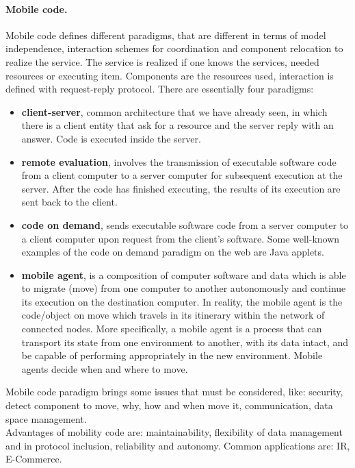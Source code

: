 \paragraph*{Mobile code.} Mobile code defines different paradigms, that are different in terms of model independence, interaction schemes for coordination and component relocation to realize the service. The service is realized if one knows the services, needed resources or executing item. Components are the resources used, interaction is defined with request-reply protocol. There are essentially four paradigms:
\begin{itemize}
	\item \textbf{client-server}, common architecture that we have already seen, in which there is a client entity that ask for a resource and the server reply with an answer. Code is executed inside the server.
	\item \textbf{remote evaluation}, involves the transmission of executable software code from a client computer to a server computer for subsequent execution at the server. After the code has finished executing, the results of its execution are sent back to the client.
	\item \textbf{code on demand}, sends executable software code from a server computer to a client computer upon request from the client's software. Some well-known examples of the code on demand paradigm on the web are Java applets.
	\item \textbf{mobile agent}, is a composition of computer software and data which is able to migrate (move) from one computer to another autonomously and continue its execution on the destination computer. In reality, the mobile agent is the code/object on move which travels in its itinerary within the network of connected nodes. More specifically, a mobile agent is a process that can transport its state from one environment to another, with its data intact, and be capable of performing appropriately in the new environment. Mobile agents decide when and where to move. 
\end{itemize}

Mobile code paradigm brings some issues that must be considered, like: security, detect component to move, why, how and when move it, communication, data space management.\\
Advantages of mobility code are: maintainability, flexibility of data management and in protocol inclusion, reliability and autonomy. Common applications are: IR, E-Commerce.

